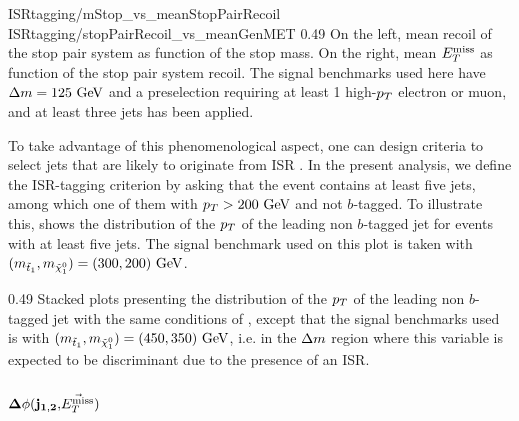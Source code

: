 
                     {ISRtagging/mStop_vs_meanStopPairRecoil}
                     {ISRtagging/stopPairRecoil_vs_meanGenMET}
                     {0.49}
                     {On the left, mean recoil of the stop pair system as
                     function of the stop mass.  On the right, mean $E_T^\text{miss}$ as
                     function of the stop pair system recoil.  The signal
                     benchmarks used here have $\Delta m = 125~\text{GeV}$ and a
                     preselection requiring at least 1 high-$p_T$ electron or
                     muon, and at least three jets has been applied.}

    To take advantage of this phenomenological aspect, one can design criteria
    to select jets that are likely to originate from ISR
    \cite{ISRGluinoTevatron, ISRtagging}.  In the present analysis, we define
    the ISR-tagging criterion by asking that the event contains at least five
    jets, among which one of them with $p_T > 200 ~\text{GeV}$ and not $b$-tagged. To
    illustrate this,  shows the
    distribution of the $p_T$ of the leading non $b$-tagged jet for events with
    at least five jets. The signal benchmark used on this plot is taken with
    $(m_{\tilde{t}_1},m_{\tilde{\chi}_1^0}) = (300,200)~\text{GeV}$.

                 {0.49}
                 {Stacked plots presenting the distribution of the $p_T$ of the
                 leading non $b$-tagged jet with the same conditions of
                 , except that the
                 signal benchmarks used is with $(m_{\tilde{t}_1},
                 m_{\tilde{\chi}_1^0}) = (450,350)~\text{GeV}$, i.e. in the $\Delta m$
                 region where this variable is expected to be discriminant due
                 to the presence of an ISR.}

                 \subsubsection{$\mathbf{\Delta \phi( j_{1,2},} \vec{E_T^\text{miss}} \mathbf{)}$ }

